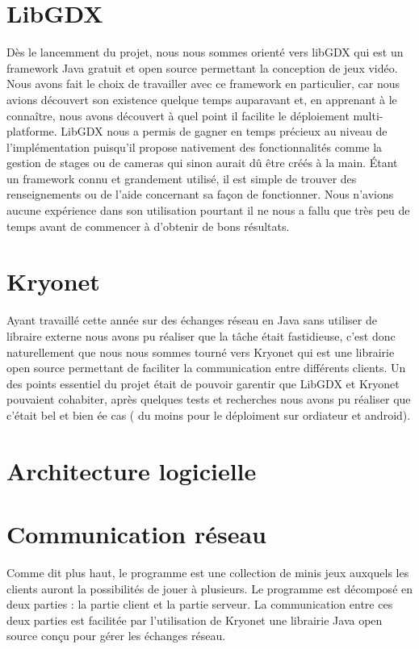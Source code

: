 \documentclass{report}
\begin{document}
\chapter{LibGDX}
Dès le lancemment du projet, nous nous sommes orienté vers libGDX qui est un framework Java gratuit et open source permettant la conception de jeux vidéo.
Nous avons fait le choix de travailler avec ce framework en particulier, car nous avions découvert son existence quelque temps auparavant et, en apprenant à le connaître,
nous avons découvert à quel point il facilite le déploiement multi-platforme.
LibGDX nous a permis de gagner en temps précieux au niveau de l’implémentation puisqu’il propose nativement des fonctionnalités comme la gestion de stages ou de cameras qui sinon aurait dû être créés à la main.
Étant un framework connu et grandement utilisé, il est simple de trouver des renseignements ou de l’aide concernant sa façon de fonctionner. Nous n’avions aucune expérience dans son utilisation pourtant il ne nous a fallu que très peu de temps avant de commencer à d’obtenir de bons résultats.

\chapter{Kryonet}
Ayant travaillé cette année sur des échanges réseau en Java sans utiliser de libraire externe nous avons pu réaliser que la tâche était fastidieuse, c'est donc naturellement que nous
nous sommes tourné vers Kryonet qui est une librairie open source permettant de faciliter la communication entre différents clients. Un des points essentiel du projet était de pouvoir
garentir que LibGDX et Kryonet pouvaient cohabiter, après quelques tests et recherches nous avons pu réaliser que c'était bel et bien ée cas ( du moins pour le déploiment sur ordiateur et android).

\chapter{Architecture logicielle}

\chapter{Communication réseau}
Comme dit plus haut, le programme est une collection de minis jeux auxquels les clients auront la possibilités de jouer à
plusieurs. Le programme est décomposé en deux parties : la partie client et la partie serveur. La communication entre ces
deux parties est facilitée par l'utilisation de Kryonet une librairie Java open source conçu pour gérer les échanges réseau.
\end{document}
